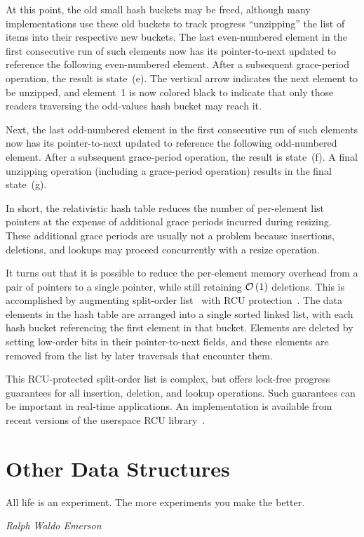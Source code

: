 At this point, the old small hash buckets may be freed, although many
implementations use these old buckets to track progress ``unzipping''
the list of items into their respective new buckets.
The last even-numbered element in the first consecutive run of such
elements now has its pointer-to-next updated to reference the following
even-numbered element.
After a subsequent grace-period operation, the result is state~(e).
The vertical arrow indicates the next element to be unzipped, and
element~1 is now colored black to indicate that only those readers traversing
the odd-values hash bucket may reach it.

Next, the last odd-numbered element in the first consecutive run of such
elements now has its pointer-to-next updated to reference the following
odd-numbered element.
After a subsequent grace-period operation, the result is state~(f).
A final unzipping operation (including a grace-period operation)
results in the final state~(g).

In short, the relativistic hash table reduces the number of per-element
list pointers at the expense of additional grace periods incurred during
resizing.
These additional grace periods are usually not a problem because
insertions, deletions, and lookups may proceed concurrently with
a resize operation.

It turns out that it is possible to reduce the per-element memory overhead
from a pair of pointers to a single pointer, while still retaining
$\mathcal{O}\left(1\right)$ deletions.
This is accomplished by augmenting split-order
list~\cite{OriShalev2006SplitOrderListHash}
with RCU
protection~\cite{MathieuDesnoyers2009URCU,PaulMcKenney2013LWNURCUhash}.
The data elements in the hash table are arranged into a single
sorted linked list, with each hash bucket referencing the first element
in that bucket.
Elements are deleted by setting low-order bits in their pointer-to-next
fields, and these elements are removed from the list by later traversals
that encounter them.

This RCU-protected split-order list is complex, but offers lock-free
progress guarantees for all insertion, deletion, and lookup operations.
Such guarantees can be important in real-time applications.
An implementation is available from recent versions of the userspace RCU
library~\cite{MathieuDesnoyers2009URCU}.

\section{Other Data Structures}
\label{sec:datastruct:Other Data Structures}
%
\epigraph{All life is an experiment.
	  The more experiments you make the better.}
	 {\emph{Ralph Waldo Emerson}}

